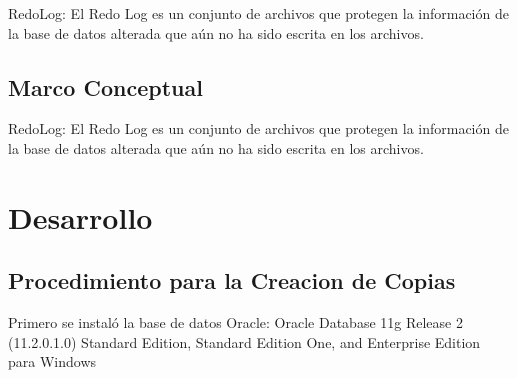 \documentclass[12pt,letterpaper]{article}
\begin{document}
RedoLog: El Redo Log es un conjunto de archivos que protegen la información de la base de datos alterada que aún no ha sido escrita en los archivos.



\subsection{Marco Conceptual}

\newpage

RedoLog: El Redo Log es un conjunto de archivos que protegen la información de la base de datos alterada que aún no ha sido escrita en los archivos.
\section{Desarrollo}
\subsection{Procedimiento para la Creacion de Copias}
Primero se instaló la base de datos Oracle:
Oracle Database 11g Release 2 (11.2.0.1.0)
Standard Edition, Standard Edition One, and Enterprise Edition para Windows\\
\end{document}
